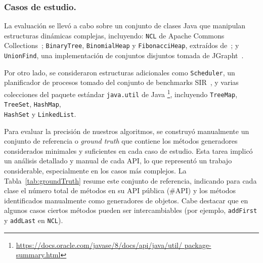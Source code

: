 \subsubsection{Casos de estudio.}


La evaluación se llevó a cabo sobre un conjunto de clases Java 
 que manipulan estructuras dinámicas complejas,
incluyendo: \verb"NCL" de Apache Commons Collections~\cite{apache};
\verb"BinaryTree", \verb"BinomialHeap" y \verb"FibonacciHeap", extraídos
de~\cite{Visser:2006}; y \verb"UnionFind", una implementación de conjuntos
disjuntos tomada de JGrapht~\cite{jgrapht}.

Por otro lado, se consideraron estructuras adicionales como \verb"Scheduler",
un planificador de procesos tomado del conjunto de benchmarks SIR~\cite{sir},
y varias colecciones del paquete estándar \verb"java.util" de Java%
\footnote{\url{https://docs.oracle.com/javase/8/docs/api/java/util/
package-summary.html}}, incluyendo \verb"TreeMap", \verb"TreeSet",
\verb"HashMap",\\
 \verb"HashSet" y \verb"LinkedList". 



Para evaluar la precisión de nuestros algoritmos, se construyó manualmente un
conjunto de referencia o \emph{ground truth} que contiene los métodos
generadores considerados minimales y suficientes en cada caso de estudio. Esta
tarea implicó un análisis detallado y manual de cada API, lo que representó un
trabajo considerable, especialmente en los casos más complejos. La
Tabla~\ref{tab:groundTruth} resume este conjunto de referencia, indicando para
cada clase el número total de métodos en su API pública (\#API) y los métodos
identificados manualmente como generadores de objetos. Cabe destacar que en algunos
casos ciertos métodos pueden ser intercambiables (por ejemplo,
\texttt{addFirst} y \texttt{addLast} en \texttt{NCL}).


